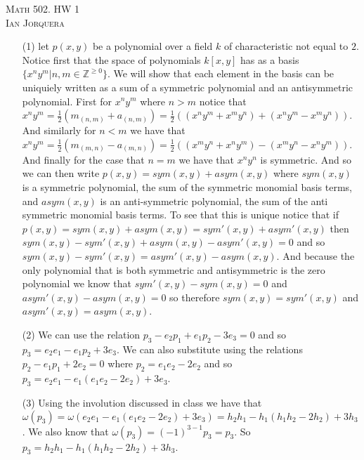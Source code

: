 \documentclass[12pt]{amsart}
\theoremstyle{definition}
\newcommand{\Z}{\mathbb{Z}}
\begin{document}
\begin{center}
    \textsc{Math 502. HW 1\\ Ian Jorquera}
\end{center}
\vspace{1em}

\begin{itemize}

\item[(1)]  %
let $p(x,y)$ be a polynomial over a field $k$ of characteristic not equal to $2$. Notice first that the space of polynomials $k[x,y]$ has as a basis $\{x^ny^m| n,m \in \Z^{\geq 0}\}$. We will show that each element in the basis can be uniquiely written as a sum of a symmetric polynomial and an antisymmetric polynomial. First for $x^ny^m$ where $n>m$ notice that $x^ny^m=\frac{1}{2}(m_{(n,m)}+a_{(n,m)})=\frac{1}{2}((x^ny^m+x^my^n)+(x^ny^m-x^my^n))$. And similarly for $n<m$ we have that $x^ny^m=\frac{1}{2}(m_{(m,n)}-a_{(m,n)})=\frac{1}{2}((x^my^n+x^ny^m)-(x^my^n-x^ny^m))$. And finally for the case that $n=m$ we have that $x^ny^n$ is symmetric. And so we can then write $p(x,y)=sym(x,y)+asym(x,y)$ where $sym(x,y)$ is a symmetric polynomial, the sum of the symmetric monomial basis terms, and $asym(x,y)$ is an anti-symmetric polynomial, the sum of the anti symmetric monomial basis terms. To see that this is unique notice that if $p(x,y)=sym(x,y)+asym(x,y)=sym'(x,y)+asym'(x,y)$ then $sym(x,y)-sym'(x,y)+asym(x,y)-asym'(x,y)=0$ and so $sym(x,y)-sym'(x,y)=asym'(x,y)-asym(x,y)$. And because the only polynomial that is both symmetric and antisymmetric is the zero polynomial we know that $sym'(x,y)-sym(x,y)=0$ and $asym'(x,y)-asym(x,y)=0$ so therefore $sym(x,y)=sym'(x,y)$ and $asym'(x,y)=asym(x,y)$.\\

\item[(2)] %
We can use the relation $p_3-e_2p_1+e_1p_2-3e_3=0$ and so $p_3=e_2e_1-e_1p_2+3e_3$. We can also substitute using the relations $p_2-e_1p_1+2e_2=0$ where $p_2=e_1e_2-2e_2$ and so $p_3= e_2e_1-e_1(e_1e_2-2e_2)+3e_3$.\\

\item[(3)] %
Using the involution discussed in class we have that $\omega(p_3)= \omega(e_2e_1-e_1(e_1e_2-2e_2)+3e_3)=h_2h_1-h_1(h_1h_2-2h_2)+3h_3$. We also know that $\omega(p_3)=(-1)^{3-1}p_3=p_3$. So $p_3=h_2h_1-h_1(h_1h_2-2h_2)+3h_3$.\\


\end{itemize}
\end{document}
